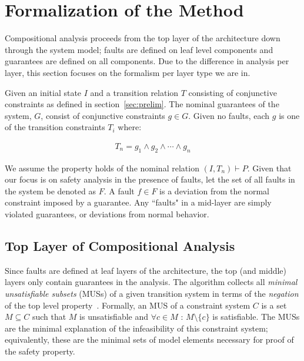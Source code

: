 \section{Formalization of the Method}
\label{sec:formMCS}
Compositional analysis proceeds from the top layer of the architecture down through the system model; faults are defined on leaf level components and guarantees are defined on all components. Due to the difference in analysis per layer, this section focuses on the formalism per layer type we are in. 

Given an initial state $I$ and a transition relation $T$ consisting of conjunctive constraints as defined in section~\ref{sec:prelim}. The nominal guarantees of the system, $G$, consist of conjunctive constraints $g \in G$. Given no faults, each $g$ is one of the transition constraints $T_i$ where:

\begin{gather}
T_n = g_1 \land  g_2 \land \cdots \land g_n
\label{eq:Tn}
\end{gather}

We assume the property holds of the nominal relation $(I,T_n) \vdash P$. Given that our focus is on safety analysis in the presence of faults, let the set of all faults in the system be  denoted as $F$. A fault $f \in F$ is a deviation from the normal constraint imposed by a guarantee. Any ``faults" in a mid-layer are simply violated guarantees, or deviations from normal behavior.

\subsection{Top Layer of Compositional Analysis}
Since faults are defined at leaf layers of the architecture, the top (and middle) layers only contain guarantees in the analysis. The \aivcalg algorithm collects all {\em minimal unsatisfiable subsets} (MUSs) of a given transition system in terms of the \textit{negation} of the top level property~\cite{Ghassabani2017EfficientGO,bendik2018online}. Formally, an MUS of a constraint system $C$ is a set $M \subseteq C$ such that $M$ is unsatisfiable and $\forall c \in M$ : $M \setminus \{c\}$ is satisfiable. The MUSs are the minimal explanation of the infeasibility of this constraint system; equivalently, these are the minimal sets of model elements necessary for proof of the safety property.

